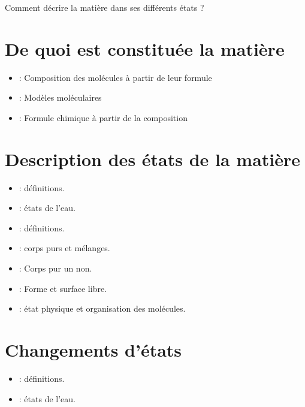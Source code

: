 \documentclass[12pt,a4paper]{article}
\date{}
\title{}
\begin{document}
	
	



\begin{mypb}
	\begin{center}
		{\Large Comment décrire la matière dans ses différents états ?}
	\end{center}
\end{mypb}


\section{De quoi est constituée la matière}








\begin{myexos}
	\begin{itemize}
		\item {} : Composition des molécules à partir de leur formule
		\item {} : Modèles moléculaires
		\item {} : Formule chimique à partir de la composition
	\end{itemize}
\end{myexos}

\section{Description des états de la matière}





\begin{myexos}
	\begin{itemize}
		\item {} : définitions.
		\item {} : états de l'eau.
		\item {} : définitions.
		\item {} : corps purs et mélanges.
		\item {} : Corps pur un non.
		\item {} : Forme et surface libre.
		\item {} : état physique et organisation des molécules.
	\end{itemize}
\end{myexos}

\section{Changements d'états}



\begin{myexos}
	\begin{itemize}
		\item {} : définitions.
		\item {} : états de l'eau.
		
	\end{itemize}
\end{myexos}



\appendix

\end{document}
